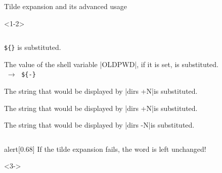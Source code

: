 \begin{frame}[fragile]{Tilde expansion and its advanced usage}
    \begin{overlayarea}{\textwidth}{0.63\textheight}
        \begin{onlyenv}<1-2>
            \vspace{-4mm}
            \begin{columns}
                \begin{column}{\dimexpr\paperwidth-10mm}
                    \begin{description}%
                        \setlength{\itemsep}{2mm}
                        \item[\texttt{\textasciitilde+}]
                            \texttt{\$\{\}} is substituted.
                        \item[\texttt{\textasciitilde-}]
                            The value of the shell variable \bash|OLDPWD|, if it is set, is substituted.\\
                            $\;\to\;$ \texttt{\$\{-\}}
                        \item[\texttt{\textasciitilde N}]
                            The string that would be displayed by \enspace\bash|dirs +N|\enspace is substituted.
                        \item[\texttt{\textasciitilde+N}]
                            The string that would be displayed by \enspace\bash|dirs +N|\enspace is substituted.
                        \item[\texttt{\textasciitilde-N}]
                            The string that would be displayed by \enspace\bash|dirs -N|\enspace is substituted.
                    \end{description}
                \end{column}
            \end{columns}
            \vspace{2mm}
            \begin{varblock}{alert}[0.68\textwidth]{}
                \large\alert{If the tilde expansion fails, the word is left unchanged!}
            \end{varblock}
        \end{onlyenv}
        \begin{onlyenv}<3->
            \begin{lstlisting}[style=MyBash, aboveskip=3mm]

\end{lstlisting}
\end{onlyenv}
\end{overlayarea}
\end{frame}
